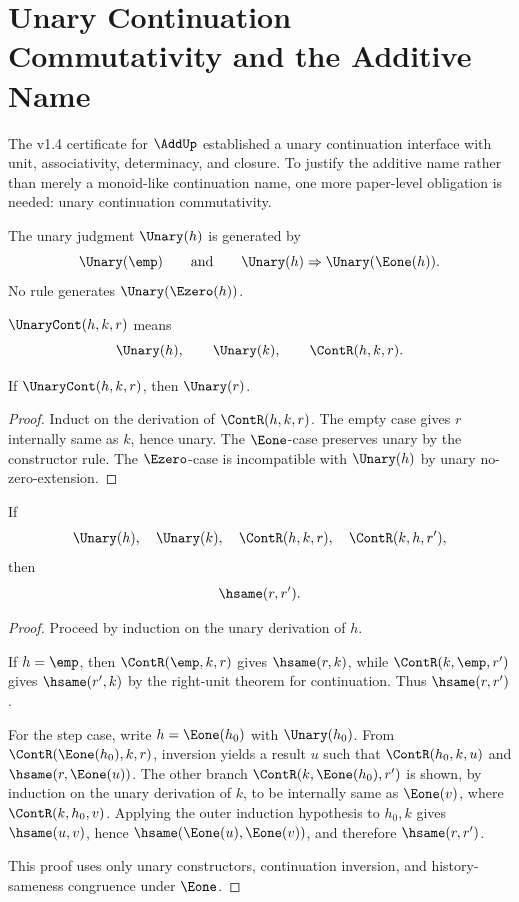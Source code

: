 \chapter{Unary Continuation Commutativity and the Additive Name}
\label{ch:v15-unary-add-commutativity}

The v1.4 certificate for \(\AddUp\) established a unary continuation interface with unit, associativity, determinacy, and closure. To justify the additive name rather than merely a monoid-like continuation name, one more paper-level obligation is needed: unary continuation commutativity.

\begin{definition}
The unary judgment \(\Unary(h)\) is generated by
\[
  \Unary(\emp)
  \qquad\text{and}\qquad
  \Unary(h)\Rightarrow \Unary(\Eone(h)).
\]
No rule generates \(\Unary(\Ezero(h))\).
\end{definition}

\begin{definition}
\(\UnaryCont(h,k,r)\) means
\[
  \Unary(h),\qquad \Unary(k),\qquad \ContR(h,k,r).
\]
\end{definition}

\begin{lemma}
If \(\UnaryCont(h,k,r)\), then \(\Unary(r)\).
\end{lemma}

\begin{proof}
Induct on the derivation of \(\ContR(h,k,r)\). The empty case gives \(r\) internally same as \(k\), hence unary. The \(\Eone\)-case preserves unary by the constructor rule. The \(\Ezero\)-case is incompatible with \(\Unary(h)\) by unary no-zero-extension.
\end{proof}

\begin{theorem}
\label{thm:v15-unary-cont-comm}
If
\[
  \Unary(h),\quad \Unary(k),\quad
  \ContR(h,k,r),\quad \ContR(k,h,r'),
\]
then
\[
  \hsame(r,r').
\]
\end{theorem}

\begin{proof}
Proceed by induction on the unary derivation of \(h\).

If \(h=\emp\), then \(\ContR(\emp,k,r)\) gives \(\hsame(r,k)\), while \(\ContR(k,\emp,r')\) gives \(\hsame(r',k)\) by the right-unit theorem for continuation. Thus \(\hsame(r,r')\).

For the step case, write \(h=\Eone(h_0)\) with \(\Unary(h_0)\). From \(\ContR(\Eone(h_0),k,r)\), inversion yields a result \(u\) such that \(\ContR(h_0,k,u)\) and \(\hsame(r,\Eone(u))\). The other branch \(\ContR(k,\Eone(h_0),r')\) is shown, by induction on the unary derivation of \(k\), to be internally same as \(\Eone(v)\), where \(\ContR(k,h_0,v)\). Applying the outer induction hypothesis to \(h_0,k\) gives \(\hsame(u,v)\), hence \(\hsame(\Eone(u),\Eone(v))\), and therefore \(\hsame(r,r')\).

This proof uses only unary constructors, continuation inversion, and history-sameness congruence under \(\Eone\).
\end{proof}

